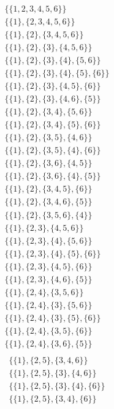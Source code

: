 \documentclass[11pt]{article}
\begin{document}
\begin{flushleft}
\begin{align*}
\{ \{ 1, 2, 3, 4, 5, 6 \} \} \\
\{\{1\}, \{2, 3, 4, 5, 6\}\}\\
\{\{1\}, \{2\}, \{3, 4, 5, 6\}\}\\
\{\{1\}, \{2\}, \{3\}, \{4, 5, 6\}\}\\
\{\{1\}, \{2\}, \{3\}, \{4\}, \{5, 6\}\}\\
\{\{1\}, \{2\}, \{3\}, \{4\}, \{5\}, \{6\}\}\\
\{\{1\}, \{2\}, \{3\}, \{4, 5\}, \{6\}\}\\
\{\{1\}, \{2\}, \{3\}, \{4, 6\}, \{5\}\}\\
\{\{1\}, \{2\}, \{3, 4\}, \{5, 6\}\}\\
\{\{1\}, \{2\}, \{3, 4\}, \{5\}, \{6\}\}\\
\{\{1\}, \{2\}, \{3, 5\}, \{4, 6\}\}\\
\{\{1\}, \{2\}, \{3, 5\}, \{4\}, \{6\}\}\\
\{\{1\}, \{2\}, \{3, 6\}, \{4, 5\}\}\\
\{\{1\}, \{2\}, \{3, 6\}, \{4\}, \{5\}\}\\
\{\{1\}, \{2\}, \{3, 4, 5\}, \{6\}\}\\
\{\{1\}, \{2\}, \{3, 4, 6\}, \{5\}\}\\
\{\{1\}, \{2\}, \{3, 5, 6\}, \{4\}\}\\
\{\{1\}, \{2, 3\}, \{4, 5, 6\}\}\\
\{\{1\}, \{2, 3\}, \{4\}, \{5, 6\}\}\\
\{\{1\}, \{2, 3\}, \{4\}, \{5\}, \{6\}\}\\
\{\{1\}, \{2, 3\}, \{4, 5\}, \{6\}\}\\
\{\{1\}, \{2, 3\}, \{4, 6\}, \{5\}\}\\
\{\{1\}, \{2, 4\}, \{3, 5, 6\}\}\\
\{\{1\}, \{2, 4\}, \{3\}, \{5, 6\}\}\\
\{\{1\}, \{2, 4\}, \{3\}, \{5\}, \{6\}\}\\
\{\{1\}, \{2, 4\}, \{3, 5\}, \{6\}\}\\
\{\{1\}, \{2, 4\}, \{3, 6\}, \{5\}\}\\
\end{align*}
\begin{align*}
\{\{1\}, \{2, 5\}, \{3, 4, 6\}\}\\
\{\{1\}, \{2, 5\}, \{3\}, \{4, 6\}\}\\
\{\{1\}, \{2, 5\}, \{3\}, \{4\}, \{6\}\}\\
\{\{1\}, \{2, 5\}, \{3, 4\}, \{6\}\}\\

\end{align*}
\end{flushleft}
\end{document}
